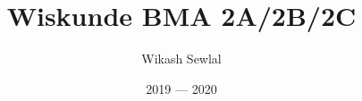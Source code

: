 \documentclass{beamer}
\title{Wiskunde BMA 2A/2B/2C}
\author{Wikash Sewlal}
\institute{Techniek College Rotterdam}
\date{2019 --- 2020}
\begin{document}
\frame{\titlepage}
% 
% 
% 
% 
% 
\end{document}
